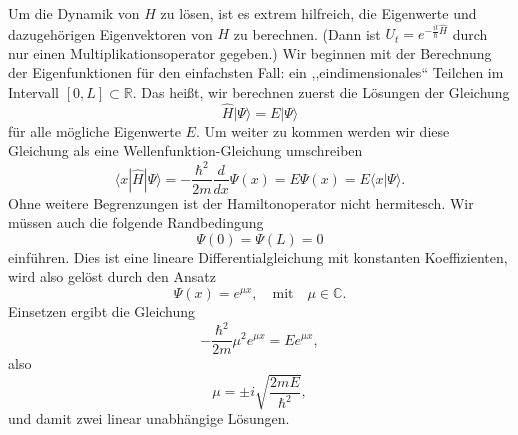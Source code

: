 Um die Dynamik von $H$ zu lösen, ist es extrem hilfreich, die Eigenwerte und dazugehörigen Eigenvektoren von $H$ zu berechnen. (Dann ist $U_t=e^{-\frac{it}{\hbar}\widehat{H}}$ durch nur einen Multiplikationsoperator gegeben.) Wir beginnen mit der Berechnung der Eigenfunktionen für den einfachsten Fall: ein ,,eindimensionales`` Teilchen im Intervall $[0,L] \subset \mathbb{R}$. Das heißt, wir berechnen zuerst die Lösungen der Gleichung
\begin{equation}
	\widehat{H}|\Psi\rangle = E|\Psi\rangle
\end{equation}
für alle mögliche Eigenwerte $E$. Um weiter zu kommen werden wir diese Gleichung als eine Wellenfunktion-Gleichung umschreiben 
\begin{equation}
	\langle x|\widehat{H}|\Psi\rangle = -\frac{\hbar^2}{2m}\frac{d}{dx}\Psi(x) = E\Psi(x) = E\langle x|\Psi\rangle.
\end{equation}
Ohne weitere Begrenzungen ist der Hamiltonoperator nicht hermitesch. Wir müssen auch die folgende Randbedingung 
\begin{equation}
	\Psi(0) = \Psi(L) = 0
\end{equation} 
einführen. Dies ist eine lineare Differentialgleichung mit konstanten Koeffizienten, wird
also gelöst durch den Ansatz 
\begin{equation}
	\Psi(x) = e^{\mu x}, \quad\text{mit}\quad \mu\in \mathbb{C}.
\end{equation}
Einsetzen ergibt die Gleichung
\begin{equation}
	-\frac{\hbar^2}{2m} \mu^2 e^{\mu x} = E e^{\mu x},
\end{equation}
also
\begin{equation}
	\mu = \pm i \sqrt{\frac{2mE}{\hbar^2}}, 
\end{equation}
und damit zwei linear unabhängige Lösungen.

